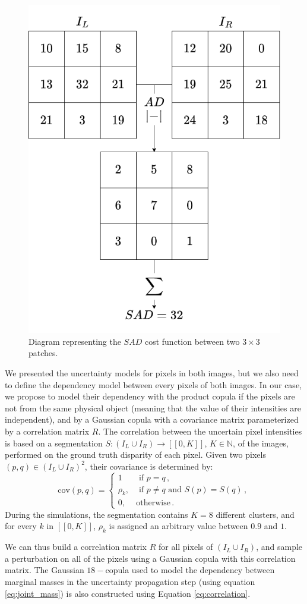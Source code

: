 \begin{figure}
    \centering
    \includegraphics[width=0.5\linewidth]{Images/Chap_4/SAD.png}
    \caption{Diagram representing the $SAD$ cost function between two $3\times3$ patches.}
    \label{fig:SAD}
\end{figure}

We presented the uncertainty models for pixels in both images, but we also need to define the dependency model between every pixels of both images. In our case, we propose to model their dependency with the product copula if the pixels are not from the same physical object (meaning that the value of their intensities are independent), and by a Gaussian copula with a covariance matrix parameterized by a correlation matrix $R$. The correlation between the uncertain pixel intensities is based on a segmentation $S:(I_L\cup I_R)\rightarrow[\![0,K]\!]$, $K\in\mathbb{N}$, of the images, performed on the ground truth disparity of each pixel. Given two pixels $(p, q)\in(I_L\cup I_R)^2$, their covariance is determined by:
\begin{equation}
    \mathrm{cov}(p, q) =
    \begin{cases}
        1 &\text{ if }p=q\,,\\
        \rho_k, &\text{ if } p\ne q\text{ and }S(p)=S(q)\,, \\
        0, & \text{otherwise}\,.
    \end{cases}\label{eq:correlation}
\end{equation}
During the simulations, the segmentation contains $K=8$ different clusters, and for every $k$ in $[\![0,K]\!]$, $\rho_k$ is assigned an arbitrary value between $0.9$ and $1$.

We can thus build a correlation matrix $R$ for all pixels of $(I_L\cup I_R)$, and sample a perturbation on all of the pixels using a Gaussian copula with this correlation matrix. The Gaussian $18-$copula used to model the dependency between marginal masses in the uncertainty propagation step (using equation \eqref{eq:joint_mass}) is also constructed using Equation \eqref{eq:correlation}. 

